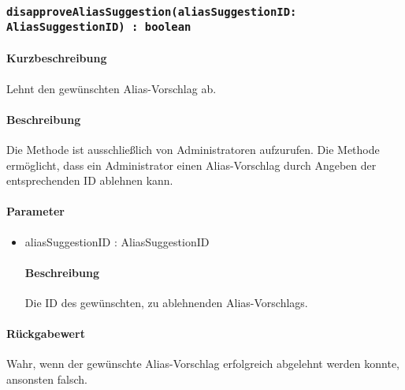\subsubsection{\texttt{disapproveAliasSuggestion(aliasSuggestionID: AliasSuggestionID) : boolean}}%
\paragraph*{Kurzbeschreibung}
Lehnt den gewünschten Alias-Vorschlag ab.
\paragraph*{Beschreibung}
Die Methode ist ausschließlich von Administratoren aufzurufen.
Die Methode ermöglicht, dass ein Administrator einen Alias-Vorschlag durch Angeben der entsprechenden ID ablehnen kann.
\paragraph*{Parameter}
\begin{itemize}
	\item aliasSuggestionID : AliasSuggestionID
		\paragraph*{Beschreibung}
		Die ID des gewünschten, zu ablehnenden Alias-Vorschlags.
\end{itemize}
\paragraph*{Rückgabewert}
Wahr, wenn der gewünschte Alias-Vorschlag erfolgreich abgelehnt werden konnte, ansonsten falsch.
